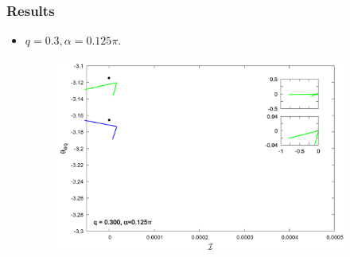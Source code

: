 \documentclass{beamer}
\begin{document}


\begin{frame}
	\frametitle{Results}
	\begin{overlayarea}{\textwidth}{\textheight}
	\begin{itemize}
		\item $q=0.3, \alpha=0.125\pi$.
		\begin{figure}[htb]
			\begin{center}
				\includegraphics[width=0.9\textwidth]{plots/combine_elastic_beam_I_theta_q_0.30_alpha_0.125pi_initial_-4.80_0.png}
			\end{center}
		\end{figure}
	\end{itemize}
	\end{overlayarea}
\end{frame}

\end{document}
